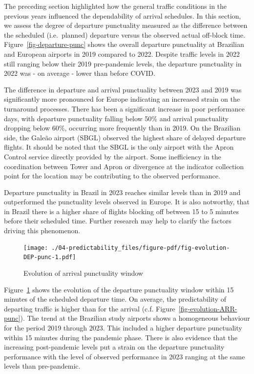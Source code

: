 \documentclass[
  a4paper,
  DIV=11,
  numbers=noendperiod]{scrreport}
\begin{document}
The preceding section highlighted how the general traffic conditions in
the previous years influenced the dependability of arrival schedules. In
this section, we assess the degree of departure punctuality measured as
the difference between the scheduled (i.e.~planned) departure versus the
observed actual off-block time. Figure~\ref{fig-departure-punc} shows
the overall departure punctuality at Brazilian and European airports in
2019 compared to 2022. Despite traffic levels in 2022 still ranging
below their 2019 pre-pandemic levels, the departure punctuality in 2022
was - on average - lower than before COVID.

The difference in departure and arrival punctuality between 2023 and
2019 was significantly more pronounced for Europe indicating an
increased strain on the turnaround processes. There has been a
significant increase in poor performance days, with departure
punctuality falling below 50\% and arrival punctuality dropping below
60\%, occurring more frequently than in 2019. On the Brazilian side, the
Galeão airport (SBGL) observed the highest share of delayed departure
flights. It should be noted that the SBGL is the only airport with the
Apron Control service directly provided by the airport. Some
inefficiency in the coordination between Tower and Apron or divergence
at the indicator collection point for the location may be contributing
to the observed performance.

Departure punctuality in Brazil in 2023 reaches similar levels than in
2019 and outperformed the punctuality levels observed in Europe. It is
also notworthy, that in Brazil there is a higher share of flights
blocking off between 15 to 5 minutes before their scheduled time.
Further research may help to clarify the factors driving this
phenomenon.

\begin{figure}[H]

{\centering \texttt{[image: ./04-predictability\_files/figure-pdf/fig-evolution-DEP-punc-1.pdf]}

}

\caption{\label{fig-evolution-DEP-punc}Evolution of arrival punctuality
window}

\end{figure}

Figure~\ref{fig-evolution-DEP-punc} shows the evolution of the departure
punctuality window within 15 minutes of the scheduled departure time. On
average, the predictability of departing traffic is higher than for the
arrival (c.f. Figure~\ref{fig-evolution-ARR-punc}). The trend at the
Brazilian study airports shows a homogeneous behaviour for the period
2019 through 2023. This included a higher departure punctuality within
15 minutes during the pandemic phase. There is also evidence that the
increasing post-pandemic levels put a strain on the departure
punctuality performance with the level of observed performance in 2023
ranging at the same levels than pre-pandemic.
\end{document}
